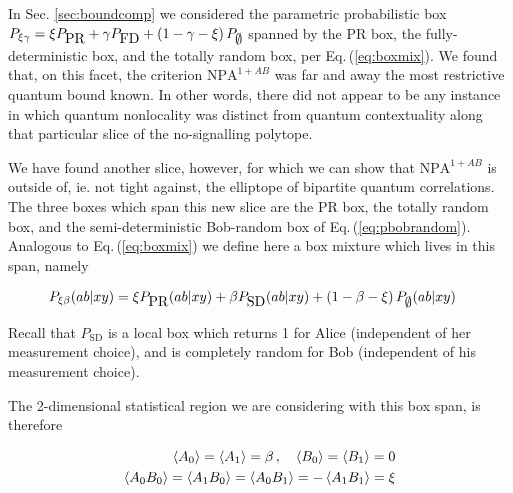 \documentclass[
  12pt          %
  ,letterpaper  %
  ,center       %
  ,noupper      %
  ,english,fleqn]{uconnthesis}
\newcommand{\LeftEqns}[1]{\begin{fleqn}[\leftmargini minus \leftmargini]\begin{align}#1\end{align}\end{fleqn}}
\newcommand{\LeftEqn}[1]{\LeftEqns{\begin{split}#1\end{split}}}
\newcommand{\ceq}[1]{Eq.\,(\ref{#1})}
\begin{document}
In Sec. \ref{sec:boundcomp} we considered the parametric probabilistic box $P_{\xi\gamma}=\xi P_{\mbox{PR}}+\gamma P_{\mbox{FD}}+\left(1-\gamma-\xi\right)P_{\mathlarger{\operatorname{{\emptyset}}}}$ spanned by the PR box, the fully-deterministic box, and the totally random box, per \ceq{eq:boxmix}. We found that, on this facet, the criterion $\mbox{NPA}^{1+AB}$ was far and away the most restrictive quantum bound known. In other words, there did not appear to be any instance in which quantum nonlocality was distinct from quantum contextuality along that particular slice of the no-signalling \gls{polytope}.

We have found another slice, however, for which we can show that $\mbox{NPA}^{1+AB}$ is outside of, ie. not tight against, the \gls{elliptope} of bipartite quantum correlations. The three boxes which span this new slice are the PR box, the totally random box, and the semi-deterministic Bob-random box of \ceq{eq:pbobrandom}. Analogous to \ceq{eq:boxmix} we define here a box mixture which lives in this span, namely
\LeftEqn{\label{eq:newbox}
&P_{\xi \beta}(ab|xy)=\xi P_{\mbox{PR}}(ab|xy)+\beta P_{\mbox{SD}}(ab|xy)+\left(1-\beta-\xi\right)P_{\mathlarger{\operatorname{{\emptyset}}}}(ab|xy)%
}
Recall that $P_{\mbox{SD}}$ is a local box which returns 1 for Alice (independent of her measurement choice), and is completely random for Bob (independent of his measurement choice). 

The 2-dimensional statistical region we are considering with this box span, is therefore
\LeftEqn{\label{eq:newboxparameters}
\Braket{A_0}=\Braket{A_1}=\beta\,,\quad \Braket{B_0}=\Braket{B_1}=0
\\  \Braket{A_0 B_0}=\Braket{A_1 B_0}=\Braket{A_0 B_1}=-\Braket{A_1 B_1} = \xi 
}
\end{document}
